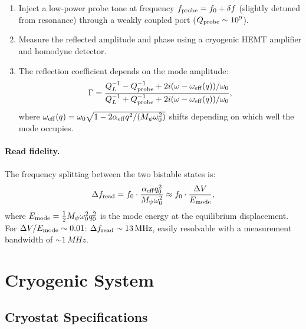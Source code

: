 \documentclass[12pt,a4paper]{article}
\begin{document}
\begin{enumerate}
\item Inject a low-power probe tone at frequency $f_{\rm probe} = f_0 + \delta f$ (slightly detuned from resonance) through a weakly coupled port ($Q_{\rm probe} \sim 10^9$).
\item Measure the reflected amplitude and phase using a cryogenic HEMT amplifier and homodyne detector.
\item The reflection coefficient depends on the mode amplitude:
\begin{equation}
\Gamma = \frac{Q_L^{-1} - Q_{\rm probe}^{-1} + 2i(\omega - \omega_{\rm eff}(q))/\omega_0}{Q_L^{-1} + Q_{\rm probe}^{-1} + 2i(\omega - \omega_{\rm eff}(q))/\omega_0},
\end{equation}
where $\omega_{\rm eff}(q) = \omega_0\sqrt{1 - 2\alpha_{\rm eff}q^2/(M_\psi\omega_0^2)}$ shifts depending on which well the mode occupies.
\end{enumerate}

\paragraph{Read fidelity.} The frequency splitting between the two bistable states is:
\begin{equation}
\Delta f_{\rm read} = f_0 \cdot \frac{\alpha_{\rm eff} q_0^2}{M_\psi \omega_0^2} \approx f_0 \cdot \frac{\Delta V}{E_{\rm mode}},
\end{equation}
where $E_{\rm mode} = \frac{1}{2}M_\psi\omega_0^2 q_0^2$ is the mode energy at the equilibrium displacement. For $\Delta V / E_{\rm mode} \sim 0.01$: $\Delta f_{\rm read} \sim 13\,\si{MHz}$, easily resolvable with a measurement bandwidth of $\sim 1\,\si{MHz}$.

\section{Cryogenic System}

\subsection{Cryostat Specifications}
\end{document}
